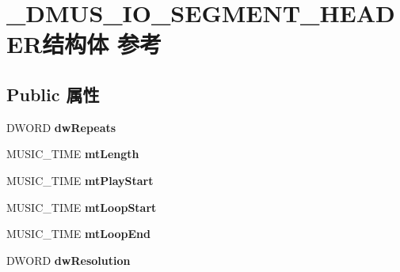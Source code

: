 \hypertarget{struct___d_m_u_s___i_o___s_e_g_m_e_n_t___h_e_a_d_e_r}{}\section{\+\_\+\+D\+M\+U\+S\+\_\+\+I\+O\+\_\+\+S\+E\+G\+M\+E\+N\+T\+\_\+\+H\+E\+A\+D\+E\+R结构体 参考}
\label{struct___d_m_u_s___i_o___s_e_g_m_e_n_t___h_e_a_d_e_r}
\subsection*{Public 属性}
\begin{DoxyCompactItemize}
\item 
\mbox{\label{struct___d_m_u_s___i_o___s_e_g_m_e_n_t___h_e_a_d_e_r_a9eddb64b112378e32d6d9e9e7d48ce69}} 
D\+W\+O\+RD {\bfseries dw\+Repeats}
\item 
\mbox{\label{struct___d_m_u_s___i_o___s_e_g_m_e_n_t___h_e_a_d_e_r_ac6a83f5194136e1bfcf28d68f45981d2}} 
M\+U\+S\+I\+C\+\_\+\+T\+I\+ME {\bfseries mt\+Length}
\item 
\mbox{\label{struct___d_m_u_s___i_o___s_e_g_m_e_n_t___h_e_a_d_e_r_a0b81241125331f0ef55a337e5040e77d}} 
M\+U\+S\+I\+C\+\_\+\+T\+I\+ME {\bfseries mt\+Play\+Start}
\item 
\mbox{\label{struct___d_m_u_s___i_o___s_e_g_m_e_n_t___h_e_a_d_e_r_a89436eb58808990e52c8ea448dcf59b8}} 
M\+U\+S\+I\+C\+\_\+\+T\+I\+ME {\bfseries mt\+Loop\+Start}
\item 
\mbox{\label{struct___d_m_u_s___i_o___s_e_g_m_e_n_t___h_e_a_d_e_r_ae45a24831f8e8148907b81b5a2ac6c2f}} 
M\+U\+S\+I\+C\+\_\+\+T\+I\+ME {\bfseries mt\+Loop\+End}
\item 
\mbox{\label{struct___d_m_u_s___i_o___s_e_g_m_e_n_t___h_e_a_d_e_r_a6641bfb1ae81951b446adfc465528a7c}} 
D\+W\+O\+RD {\bfseries dw\+Resolution}

\end{DoxyCompactItemize}
